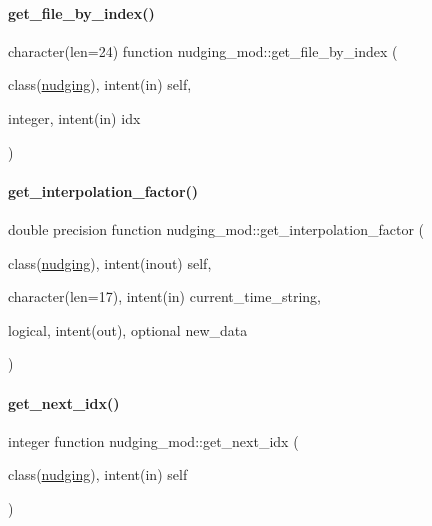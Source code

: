 \paragraph{\texorpdfstring{get\+\_\+file\+\_\+by\+\_\+index()}{get\_file\_by\_index()}}
{\footnotesize\ttfamily character(len=24) function nudging\+\_\+mod\+::get\+\_\+file\+\_\+by\+\_\+index (\begin{DoxyParamCaption}\item[{class(\mbox{\hyperlink{structnudging__mod_1_1nudging}{nudging}}), intent(in)}]{self,  }\item[{integer, intent(in)}]{idx }\end{DoxyParamCaption})\hspace{0.3cm}{\ttfamily [private]}}

\mbox{\label{namespacenudging__mod_a9075b50dbf7142e7c28b779888383e5f}} 
\paragraph{\texorpdfstring{get\+\_\+interpolation\+\_\+factor()}{get\_interpolation\_factor()}}
{\footnotesize\ttfamily double precision function nudging\+\_\+mod\+::get\+\_\+interpolation\+\_\+factor (\begin{DoxyParamCaption}\item[{class(\mbox{\hyperlink{structnudging__mod_1_1nudging}{nudging}}), intent(inout)}]{self,  }\item[{character(len=17), intent(in)}]{current\+\_\+time\+\_\+string,  }\item[{logical, intent(out), optional}]{new\+\_\+data }\end{DoxyParamCaption})\hspace{0.3cm}{\ttfamily [private]}}

\mbox{\label{namespacenudging__mod_a2a4e356c3d28fa6bcce757166a7bf377}} 
\paragraph{\texorpdfstring{get\+\_\+next\+\_\+idx()}{get\_next\_idx()}}
{\footnotesize\ttfamily integer function nudging\+\_\+mod\+::get\+\_\+next\+\_\+idx (\begin{DoxyParamCaption}\item[{class(\mbox{\hyperlink{structnudging__mod_1_1nudging}{nudging}}), intent(in)}]{self }\end{DoxyParamCaption})\hspace{0.3cm}{\ttfamily [private]}}

